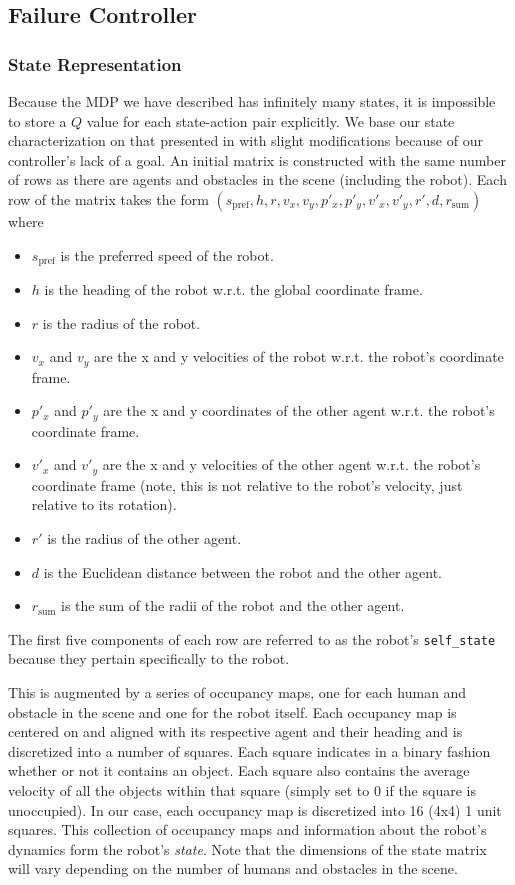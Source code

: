 \documentclass[letterpaper]{article}
\begin{document}
			\subsection{Failure Controller}
				\subsubsection{State Representation}
				Because the MDP we have described has infinitely many states, it is impossible to store a $Q$ value for each state-action pair explicitly. We base our state characterization on that presented in \cite{crowdawarerl} with slight modifications because of our controller's lack of a goal. An initial matrix is constructed with the same number of rows as there are agents and obstacles in the scene (including the robot). Each row of the matrix takes the form $(s_\text{pref}, h, r, v_x, v_y, p'_x, p'_y, v'_x, v'_y, r', d, r_\text{sum})$ where 
				\begin{itemize}
					\item $s_\text{pref}$ is the preferred speed of the robot.
					\item $h$ is the heading of the robot w.r.t. the global coordinate frame.
					\item $r$ is the radius of the robot.
					\item $v_x$ and $v_y$ are the x and y velocities of the robot w.r.t. the robot's coordinate frame.
					\item $p'_x$ and $p'_y$ are the x and y coordinates of the other agent w.r.t. the robot's coordinate frame.
					\item $v'_x$ and $v'_y$ are the x and y velocities of the other agent w.r.t. the robot's coordinate frame (note, this is not relative to the robot's velocity, just relative to its rotation).
					\item $r'$ is the radius of the other agent.
					\item $d$ is the Euclidean distance between the robot and the other agent.
					\item $r_\text{sum}$ is the sum of the radii of the robot and the other agent.
				\end{itemize}
				The first five components of each row are referred to as the robot's \verb|self_state| because they pertain specifically to the robot.
				
				This is augmented by a series of occupancy maps, one for each human and obstacle in the scene and one for the robot itself. Each occupancy map is centered on and aligned with its respective agent and their heading and is discretized into a number of squares. Each square indicates in a binary fashion whether or not it contains an object. Each square also contains the average velocity of all the objects within that square (simply set to 0 if the square is unoccupied). In our case, each occupancy map is discretized into 16 (4x4) 1 unit squares. This collection of occupancy maps and information about the robot's dynamics form the robot's \textit{state}. Note that the dimensions of the state matrix will vary depending on the number of humans and obstacles in the scene.
				
\end{document}
